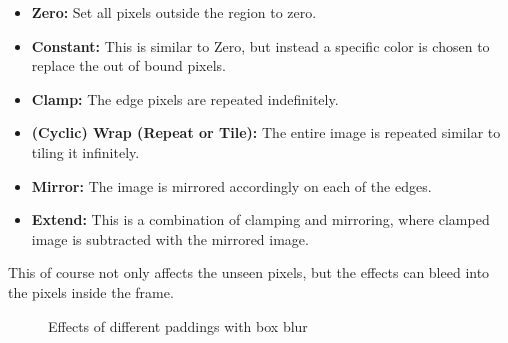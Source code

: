\documentclass[twoside,a4paper,article]{combine}
\begin{document}
\begin{itemize}
    \item \textbf{Zero:} Set all pixels outside the region to zero.
    \item \textbf{Constant:} This is similar to Zero, but instead a specific color is chosen to replace the out of bound pixels.
    \item \textbf{Clamp:} The edge pixels are repeated indefinitely.
    \item \textbf{(Cyclic) Wrap (Repeat or Tile):} The entire image is repeated similar to tiling it infinitely.
    \item \textbf{Mirror:} The image is mirrored accordingly on each of the edges.
    \item \textbf{Extend:} This is a combination of clamping and mirroring, where clamped image is subtracted with the mirrored image.
\end{itemize}

This of course not only affects the unseen pixels, but the effects can bleed into the pixels inside the frame.
\begin{minipage}{\textwidth}\begin{figure}[H]
    \centering
    \caption{Effects of different paddings with box blur}
    \label{fig:boxBlur_borders}
\end{figure}\end{minipage}
\end{document}
